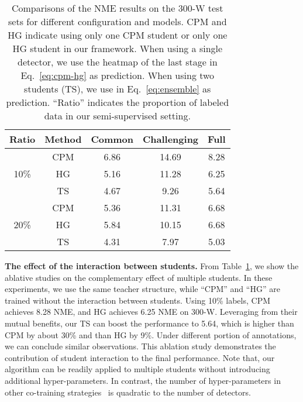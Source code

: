 \documentclass[10pt,twocolumn,letterpaper]{article}
\def\Eqref#1{{Eq.~\eqref{#1}}}
\def\NAME{{{TS}}} \def\LLB{\textcolor{red}}
\begin{document}
\begin{table}[t]
\setlength{\tabcolsep}{2.5mm} 
\centering
\begin{tabular}{|c|c|c|c|c|} \hline\hline
   Ratio               & Method              & Common & Challenging & Full \\\hline
 \multirow{3}{*}{10\%} & CPM                 & 6.86   & 14.69       & 8.28     \\
                       & HG                  & 5.16   & 11.28       & 6.25     \\
                       & {\NAME}               & 4.67   & 9.26        & 5.64     \\\hline

 \multirow{3}{*}{20\%} & CPM                 & 5.36   & 11.31       & 6.68     \\
                       & HG                  & 5.84   & 10.15       & 6.68     \\
                       & {\NAME}               & 4.31   & 7.97        & 5.03     \\\hline\hline
\end{tabular}
\vspace{2mm}
\caption{
Comparisons of the NME results on the 300-W test sets for different configuration and models.
CPM and HG indicate using only one CPM student or only one HG student in our framework.
When using a single detector, we use the heatmap of the last stage in \Eqref{eq:cpm-hg} as prediction.
When using two students ({\NAME}), we use  in \Eqref{eq:ensemble} as prediction.
``Ratio'' indicates the proportion of labeled data in our semi-supervised setting.
}
\vspace{-2mm}
\label{table:300W-ALL-Ablation}
\end{table}




\textbf{The effect of the interaction between students.}
From Table~\ref{table:300W-ALL-Ablation}, we show the ablative studies on the complementary effect of multiple students.
In these experiments, we use the same teacher structure, while ``CPM'' and ``HG'' are trained without the interaction between students.
Using 10\% labels, CPM achieves 8.28 NME, and HG achieves 6.25 NME on 300-W.
Leveraging from their mutual benefits, our {\NAME} can boost the performance to 5.64, which is higher than CPM by about 30\% and than HG by 9\%.
Under different portion of annotations, we can conclude similar observations. This ablation study demonstrates the contribution of student interaction to the final performance. 
Note that, our algorithm can be readily applied to multiple students without introducing additional hyper-parameters.
In contrast, the number of hyper-parameters in other co-training strategies~\cite{ma2017self,dong2018few} is quadratic to the number of detectors.
\end{document}
